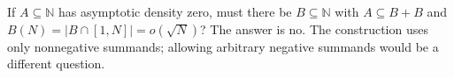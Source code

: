 If $A\subseteq\mathbb N$ has asymptotic density zero, must there be $B\subseteq\mathbb N$ with $A\subseteq B+B$ and $B(N)=|B\cap[1,N]|=o(\sqrt N)$? The answer is no. The construction uses only nonnegative summands; allowing arbitrary negative summands would be a different question.
